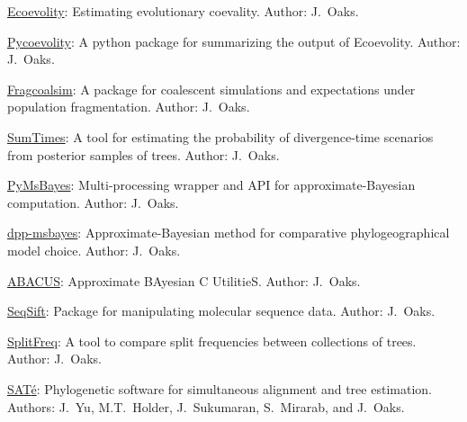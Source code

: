 \myHangIndent
\href{https://github.com/phyletica/ecoevolity}{Ecoevolity}:
    Estimating evolutionary coevality.
    Author: J.\ Oaks.

\myHangIndent
\href{https://github.com/phyletica/sumcoevolity}{Pycoevolity}:
    A python package for summarizing the output of Ecoevolity.
    Author: J.\ Oaks.

\myHangIndent
\href{https://github.com/joaks1/fragcoalsim}{Fragcoalsim}:
    A package for coalescent simulations and expectations under population
    fragmentation.
    Author: J.\ Oaks.

\myHangIndent
\href{https://github.com/phyletica/SumTimes}{SumTimes}:
    A tool for estimating the probability of divergence-time scenarios from
    posterior samples of trees.
    Author: J.\ Oaks.

\myHangIndent
\href{https://github.com/joaks1/PyMsBayes}{PyMsBayes}:
    Multi-processing wrapper and API for approximate-Bayesian
    computation.
    Author: J.\ Oaks.

\myHangIndent
\href{https://github.com/joaks1/dpp-msbayes}{dpp-msbayes}:
    Approximate-Bayesian method for comparative phylogeographical model choice.
    Author: J.\ Oaks.

\myHangIndent
\href{https://github.com/joaks1/abacus}{ABACUS}:
    Approximate BAyesian C UtilitieS.
    Author: J.\ Oaks.

\myHangIndent
\href{https://github.com/joaks1/SeqSift}{SeqSift}:
    Package for manipulating molecular sequence data.
    Author: J.\ Oaks.

\myHangIndent
\href{https://github.com/joaks1/abacus}{SplitFreq}:
    A tool to compare split frequencies between collections of trees.
    Author: J.\ Oaks.

\myHangIndent
\href{http://phylo.bio.ku.edu/software/sate/sate.html}{{SAT}\'{e}}:
    Phylogenetic software for simultaneous alignment and tree estimation.
    Authors: J.\ Yu, M.T.\ Holder, J.\ Sukumaran, S.\ Mirarab, and J.\ Oaks.
